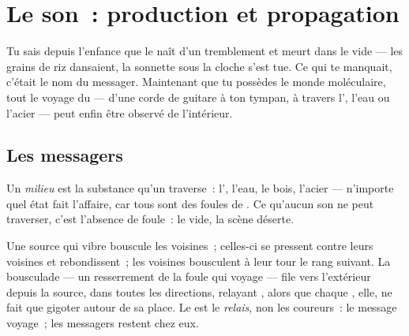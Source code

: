 \chapter{Le son~: production et propagation}\label{ch:g7:sound-production}

Tu sais depuis l'enfance que le  naît d'un tremblement et meurt
dans le vide --- les grains de riz dansaient, la sonnette sous la
cloche s'est tue. Ce qui te manquait, c'était le nom du messager.
Maintenant que tu possèdes le monde moléculaire, tout le voyage du
 --- d'une corde de guitare à ton tympan, à travers l', l'eau
ou l'acier --- peut enfin être observé de l'intérieur.

\section{Les messagers}

\begin{definition}[Milieu]\label{def:g7:sound-production:medium}
Un \emph{milieu} est la substance qu'un  traverse~:
l', l'eau, le bois, l'acier --- n'importe quel état fait
l'affaire, car tous sont des foules de . Ce qu'aucun son ne
peut traverser, c'est l'absence de foule~: le vide, la scène
déserte.
\end{definition}

\begin{proposition}\label{prop:g7:sound-production:travel}
Une source qui vibre bouscule les  voisines~; celles-ci se
pressent contre leurs voisines et rebondissent~; les voisines
bousculent à leur tour le rang suivant. La bousculade --- un
resserrement de la foule qui voyage --- file vers l'extérieur depuis
la source, dans toutes les directions,  relayant ,
alors que chaque , elle, ne fait que gigoter autour de sa
place. Le  est le \emph{relais}, non les coureurs~: le message
voyage~; les messagers restent chez eux.
\end{proposition}

